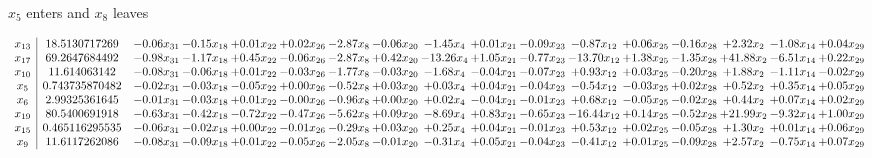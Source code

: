 \documentclass[9pt]{article}
\begin{document}
 $ x_{5} $ enters and $ x_{8} $ leaves 

 \[\begin{array}{c| c c@{\hskip 2pt} c@{\hskip 2pt} c@{\hskip 2pt} c@{\hskip 2pt} c@{\hskip 2pt} c@{\hskip 2pt} c@{\hskip 2pt} c@{\hskip 2pt} c@{\hskip 2pt} c@{\hskip 2pt} c@{\hskip 2pt} c@{\hskip 2pt} c@{\hskip 2pt} c@{\hskip 2pt} c@{\hskip 2pt} }
 x_{13}   &  18.5130717269 & -0.06 x_{31} & -0.15 x_{18} & +  0.01 x_{22} & +  0.02 x_{26} & -2.87 x_{8} & -0.06 x_{20} & -1.45 x_{4} & +  0.01 x_{21} & -0.09 x_{23} & -0.87 x_{12} & +  0.06 x_{25} & -0.16 x_{28} & +  2.32 x_{2} & -1.08 x_{14} & +  0.04 x_{29}\\
 x_{17}   &  69.2647684492 & -0.98 x_{31} & -1.17 x_{18} & +  0.45 x_{22} & -0.06 x_{26} & -2.87 x_{8} & +  0.42 x_{20} & -13.26 x_{4} & +  1.05 x_{21} & -0.77 x_{23} & -13.70 x_{12} & +  1.38 x_{25} & -1.35 x_{28} & + 41.88 x_{2} & -6.51 x_{14} & +  0.22 x_{29}\\
 x_{10}   &  11.614063142 & -0.08 x_{31} & -0.06 x_{18} & +  0.01 x_{22} & -0.03 x_{26} & -1.77 x_{8} & -0.03 x_{20} & -1.68 x_{4} & -0.04 x_{21} & -0.07 x_{23} & +  0.93 x_{12} & +  0.03 x_{25} & -0.20 x_{28} & +  1.88 x_{2} & -1.11 x_{14} & -0.02 x_{29}\\
 x_{5}   &  0.743735870482 & -0.02 x_{31} & -0.03 x_{18} & -0.05 x_{22} & +  0.00 x_{26} & -0.52 x_{8} & +  0.03 x_{20} & +  0.03 x_{4} & +  0.04 x_{21} & -0.04 x_{23} & -0.54 x_{12} & -0.03 x_{25} & +  0.02 x_{28} & +  0.52 x_{2} & +  0.35 x_{14} & +  0.05 x_{29}\\
 x_{6}   &  2.99325361645 & -0.01 x_{31} & -0.03 x_{18} & +  0.01 x_{22} & -0.00 x_{26} & -0.96 x_{8} & +  0.00 x_{20} & +  0.02 x_{4} & -0.04 x_{21} & -0.01 x_{23} & +  0.68 x_{12} & -0.05 x_{25} & -0.02 x_{28} & +  0.44 x_{2} & +  0.07 x_{14} & +  0.02 x_{29}\\
 x_{19}   &  80.5400691918 & -0.63 x_{31} & -0.42 x_{18} & -0.72 x_{22} & -0.47 x_{26} & -5.62 x_{8} & +  0.09 x_{20} & -8.69 x_{4} & +  0.83 x_{21} & -0.65 x_{23} & -16.44 x_{12} & +  0.14 x_{25} & -0.52 x_{28} & + 21.99 x_{2} & -9.32 x_{14} & +  1.00 x_{29}\\
 x_{15}   &  0.465116295535 & -0.06 x_{31} & -0.02 x_{18} & +  0.00 x_{22} & -0.01 x_{26} & -0.29 x_{8} & +  0.03 x_{20} & +  0.25 x_{4} & +  0.04 x_{21} & -0.01 x_{23} & +  0.53 x_{12} & +  0.02 x_{25} & -0.05 x_{28} & +  1.30 x_{2} & +  0.01 x_{14} & +  0.06 x_{29}\\
 x_{9}   &  11.6117262086 & -0.08 x_{31} & -0.09 x_{18} & +  0.01 x_{22} & -0.05 x_{26} & -2.05 x_{8} & -0.01 x_{20} & -0.31 x_{4} & +  0.05 x_{21} & -0.04 x_{23} & -0.41 x_{12} & +  0.01 x_{25} & -0.09 x_{28} & +  2.57 x_{2} & -0.75 x_{14} & +  0.07 x_{29}\\

\end{array}\]
\end{document}
